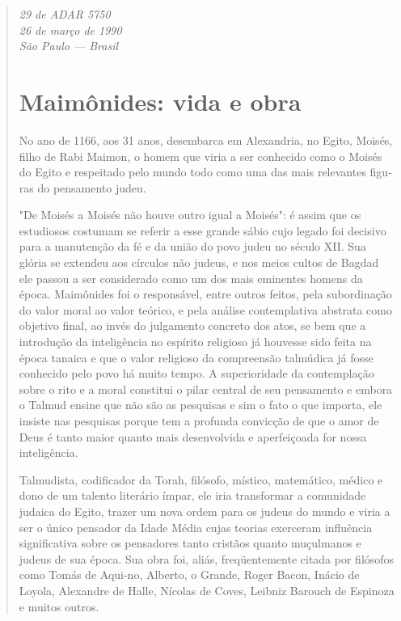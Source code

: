 \begin{quote}
\emph{29 de ADAR 5750\\
26 de março de 1990\\
São Paulo --- Brasil}


\chapter{Maimônides: vida e obra}

No ano de 1166, aos 31 anos, desembarca em Alexandria, no Egito, Moisés,
filho de Rabi Maimon, o homem que viria a ser conhecido como o Moi­sés
do Egito e respeitado pelo mundo todo como uma das mais relevantes
figu­ras do pensamento judeu.

"De Moisés a Moisés não houve outro igual a Moisés": é assim que os
estudiosos costumam se referir a esse grande sábio cujo legado foi
decisivo para a manutenção da fé e da união do povo judeu no século XII.
Sua glória se extendeu aos círculos não judeus, e nos meios cultos de
Bagdad ele passou a ser considerado como um dos mais eminentes homens da
época. Maimôni­des foi o responsável, entre outros feitos, pela
subordinação do valor moral ao valor teórico, e pela análise
contemplativa abstrata como objetivo final, ao invés do julgamento
concreto dos atos, se bem que a introdução da inteligên­cia no espírito
religioso já houvesse sido feita na época tanaica e que o valor
religioso da compreensão talmúdica já fosse conhecido pelo povo há muito
tem­po. A superioridade da contemplação sobre o rito e a moral constitui
o pilar central de seu pensamento e embora o Talmud ensine que não são
as pesquisas e sim o fato o que importa, ele insiste nas pesquisas
porque tem a profunda convicção de que o amor de Deus é tanto maior
quanto mais desenvolvida e aperfeiçoada for nossa inteligência.

Talmudista, codificador da Torah, filósofo, místico, matemático, mé­dico
e dono de um talento literário ímpar, ele iria transformar a comunidade
judaica do Egito, trazer um nova ordem para os judeus do mundo e viria a
ser o único pensador da Idade Média cujas teorias exerceram influência
significati­va sobre os pensadores tanto cristãos quanto muçulmanos e
judeus de sua épo­ca. Sua obra foi, aliás, freqüentemente citada por
filósofos como Tomás de Aqui-no, Alberto, o Grande, Roger Bacon, Inácio
de Loyola, Alexandre de Halle, Ní­colas de Coves, Leibniz Barouch de
Espinoza e muitos outros.


\end{quote}
